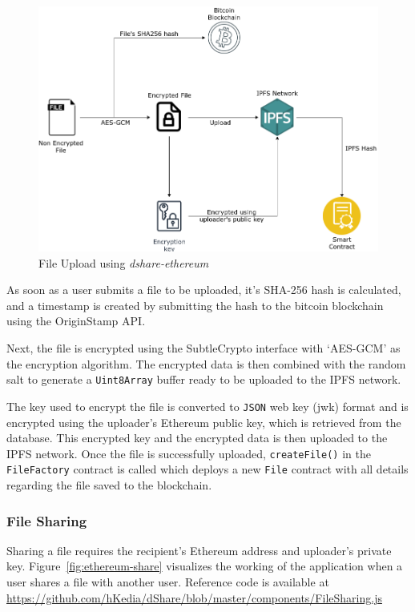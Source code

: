 \begin{figure}[h]
	\includegraphics[width=\linewidth]{figures/ethereum-upload}
	\caption{\label{fig:ethereum-upload} File Upload using \textit{dshare-ethereum}}
\end{figure}

As soon as a user submits a file to be uploaded, it's SHA-256\cite{web:sha256:1} hash is calculated, and a timestamp is created by submitting the hash to the bitcoin blockchain using the OriginStamp API\cite{web:osdoc:1}.

Next, the file is encrypted using the SubtleCrypto\cite{web:subcrypto:1} interface with `AES-GCM' as the encryption algorithm. The encrypted data is then combined with the random salt to generate a \texttt{Uint8Array} buffer ready to be uploaded to the IPFS network.

The key used to encrypt the file is converted to \texttt{JSON} web key (jwk) format and is encrypted using the uploader's Ethereum public key, which is retrieved from the database. This encrypted key and the encrypted data is then uploaded to the IPFS network. Once the file is successfully uploaded, \texttt{createFile()} in the \texttt{FileFactory} contract is called which deploys a new \texttt{File} contract with all details regarding the file saved to the blockchain.

\subsubsection{File Sharing}
Sharing a file requires the recipient's Ethereum address and uploader's private key. Figure~\ref{fig:ethereum-share} visualizes the working of the application when a user shares a file with another user. Reference code is available at \url{https://github.com/hKedia/dShare/blob/master/components/FileSharing.js}

